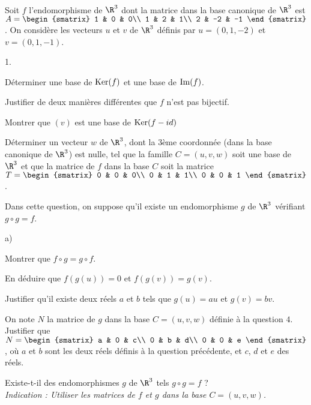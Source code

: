 \documentclass[11pt]{article}%
\begin{document}
\begin{exercice}~\\
Soit $f$ l'endomorphisme de $\R^3$ dont la matrice dans la base 
canonique de $\R^3$ est $A= 
\begin{smatrix} 
  1 & 0 & 0\\ 
  1 & 2 & 1\\ 
  2 & -2 & -1 
\end{smatrix}$. On 
considère les vecteurs $u$ et $v$ de $\R^3$ définis par $u=(0,1,-2)$ et 
$v=(0,1,-1)$.
\begin{noliste}{1.}
\item Déterminer une base de $\operatorname{Ker}(f)$ et une base de $\operatorname{Im}(f)$.
\item Justifier de deux manières différentes que $f$ n'est pas 
bijectif.
\item Montrer que $(v)$ est une base de $\operatorname{Ker}(f-id)$
\item Déterminer un vecteur $w$ de $\R^3$, dont la 3ème coordonnée 
(dans la base canonique de $\R^3$) est nulle, tel que la famille 
$C=(u,v,w)$ soit une base de $\R^3$ et que la matrice de $f$ dans la 
base $C$ soit la matrice $T= 
\begin{smatrix} 
  0 & 0 & 0\\ 
  0 & 1 & 1\\ 
  0 & 0 & 1 
\end{smatrix}$.
\item Dans cette question, on suppose qu'il existe un endomorphisme $g$ 
de $\R^3$ vérifiant $g \circ g=f$.
\begin{noliste}{a)}
\item Montrer que $f \circ g = g \circ f$.
\item En déduire que $f(g(u))=0$ et $f(g(v))=g(v)$.
\item Justifier qu'il existe deux réels $a$ et $b$ tels que $g(u)=au$ 
et $g(v)=bv$.
\item On note $N$ la matrice de $g$ dans la base $C=(u,v,w)$ définie à 
la question $4$. Justifier que $N= 
\begin{smatrix} 
  a & 0 & c\\ 
  0 & b & d\\ 
  0 & 0 & e 
\end{smatrix}$, où 
$a$ et $b$ sont les deux réels définis à la question précédente, et 
$c$, $d$ et $e$ des réels.
\end{noliste}
\item Existe-t-il des endomorphismes $g$ de $\R^3$ tels $g \circ g =f$ 
?\\
{\it Indication : Utiliser les matrices de $f$ et $g$ dans la base 
$C=(u,v,w)$.}
\end{noliste}
\end{exercice}
\end{document}
